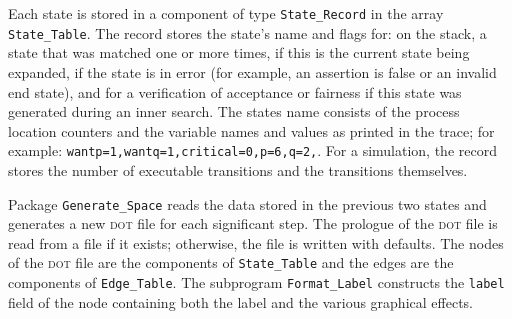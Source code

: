 \documentclass[11pt]{article}
\newcommand*{\dt}{\textsc{dot}}
\newcommand*{\p}[1]{\texttt{#1}}
\begin{document}
Each state is stored in a component of type \p{State\_Record} in the
array \p{State\_Table}. The record stores the state's name and flags
for: on the stack, a state that was matched one or more times, if this
is the current state being expanded, if the state is in error (for
example, an assertion is false or an invalid end state), and for a
verification of acceptance or fairness if this state was generated
during an inner search. The states name consists of the process location
counters and the variable names and values as printed in the trace; for
example: \verb+wantp=1,wantq=1,critical=0,p=6,q=2,+. For a simulation,
the record stores the number of executable transitions and the
transitions themselves.

Package \p{Generate\_Space} reads the data stored in the previous two
states and generates a new \dt{} file for each significant step. The
prologue of the \dt{} file is read from a file if it exists; otherwise,
the file is written with defaults. The nodes of the \dt{} file are
the components of \p{State\_Table} and the edges are the components of
\p{Edge\_Table}. The subprogram \p{Format\_Label} constructs the
\p{label} field of the node containing both the label and the various
graphical effects.
\end{document}
